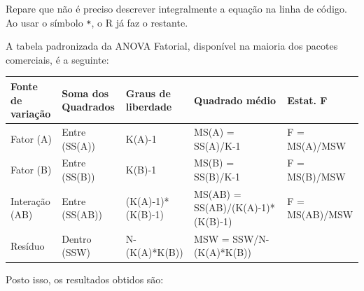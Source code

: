\documentclass[
]{book}
\newenvironment{Shaded}{\begin{snugshade}}{\end{snugshade}}
\newcommand{\AttributeTok}[1]{\textcolor[rgb]{0.77,0.63,0.00}{#1}}
\newcommand{\ConstantTok}[1]{\textcolor[rgb]{0.00,0.00,0.00}{#1}}
\newcommand{\FunctionTok}[1]{\textcolor[rgb]{0.00,0.00,0.00}{#1}}
\newcommand{\NormalTok}[1]{#1}
\newcommand{\SpecialCharTok}[1]{\textcolor[rgb]{0.00,0.00,0.00}{#1}}
\begin{document}
Repare que não é preciso descrever integralmente a equação na linha de código. Ao usar o símbolo \texttt{*}, o R já faz o restante.

A tabela padronizada da ANOVA Fatorial, disponível na maioria dos pacotes comerciais, é a seguinte:

\begin{longtable}[]{@{}
  >{\raggedright\arraybackslash}p{}
  >{\raggedright\arraybackslash}p{}
  >{\raggedright\arraybackslash}p{}
  >{\raggedright\arraybackslash}p{}
  >{\raggedright\arraybackslash}p{}@{}}
\toprule
Fonte de variação & Soma dos Quadrados & Graus de liberdade & Quadrado médio & Estat. F \\
\midrule
\endhead
Fator (A) & Entre (SS(A)) & K(A)-1 & MS(A) = SS(A)/K-1 & F = MS(A)/MSW \\
Fator (B) & Entre (SS(B)) & K(B)-1 & MS(B) = SS(B)/K-1 & F = MS(B)/MSW \\
Interação (AB) & Entre (SS(AB)) & (K(A)-1)*(K(B)-1) & MS(AB) = SS(AB)/(K(A)-1)*(K(B)-1) & F = MS(AB)/MSW \\
Resíduo & Dentro (SSW) & N-(K(A)*K(B)) & MSW = SSW/N-(K(A)*K(B)) & \\
\bottomrule
\end{longtable}

Posto isso, os resultados obtidos são:

\begin{Shaded}
\end{Shaded}
\end{document}
